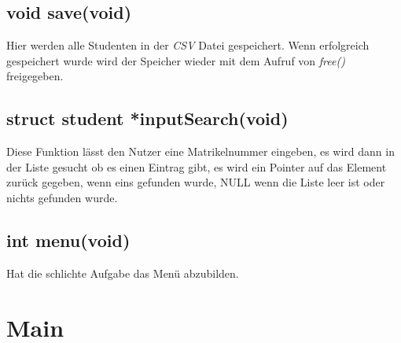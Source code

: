 \documentclass[a4paper, 11pt, oneside]{book} %
\begin{document}
\section{void save(void)}
Hier werden alle Studenten in der \textit{CSV} Datei gespeichert. Wenn erfolgreich gespeichert wurde wird der Speicher wieder mit dem Aufruf von \textit{free()} freigegeben.

\section{struct student *inputSearch(void)}
Diese Funktion lässt den Nutzer eine Matrikelnummer eingeben, es wird dann in der Liste gesucht ob es einen Eintrag gibt, es wird ein Pointer auf das Element zurück gegeben, wenn eins gefunden wurde, NULL wenn die Liste leer ist oder nichts gefunden wurde.


\section{int menu(void)}
Hat die schlichte Aufgabe das Menü abzubilden.

\chapter{Main}
\end{document}
